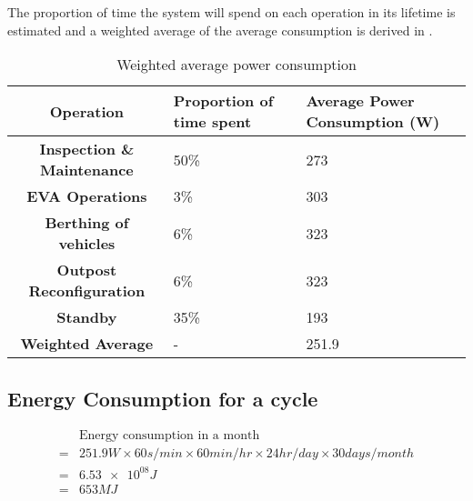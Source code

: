 The proportion of time the system will spend on each operation in its lifetime is estimated and a weighted average of the average consumption is derived in .
\begin{table}[H]
\centering
\caption{Weighted average power consumption}
\begin{tabular}{cC{4cm}C{4cm}}
\toprule
\textbf{Operation}	&	\textbf{Proportion of time spent}	&	\textbf{Average Power Consumption (W)}\\\midrule
\textbf{Inspection \& Maintenance}
&	50\%&	273\\
\textbf{EVA Operations}
&	3\%	&	303\\
\textbf{Berthing of vehicles}
&	6\%	&	323\\
\textbf{Outpost Reconfiguration}
&	6\%	&	323\\
\textbf{Standby}
&	35\%&	193\\\hline
\textbf{Weighted Average}
&	-	&	251.9\\\bottomrule
\end{tabular}
\label{tab:opfreq}
\end{table}

\subsection*{Energy Consumption for a cycle}
$$\begin{aligned}
&\mbox{Energy consumption in a month}\\
=&251.9 W \times 60 s/min\times 60min/hr \times 24hr/day \times 30days/month\\=&\num{6.53e+08} J\\=&653 MJ
\end{aligned}$$
